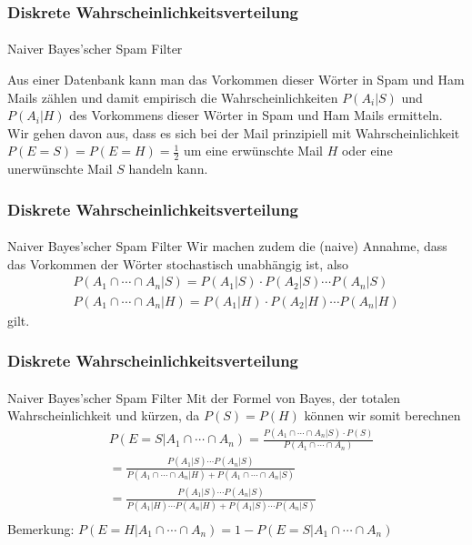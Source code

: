 \documentclass{beamer}
\begin{document}
\begin{frame}
    \frametitle{Diskrete Wahrscheinlichkeitsverteilung}
\framesubtitle{}

\begin{block}{Naiver Bayes'scher Spam Filter}

Aus einer Datenbank kann man das Vorkommen dieser Wörter in Spam und Ham Mails zählen und damit empirisch die Wahrscheinlichkeiten $P(A_i | S)$ und $P(A_i | H) $ des Vorkommens dieser Wörter in Spam und Ham Mails ermitteln.  Wir gehen davon aus, dass es sich bei der Mail  prinzipiell mit  Wahrscheinlichkeit $P(E= S) = P(E= H)= \frac{1}{2}$  um eine erwünschte  Mail $H$ oder eine unerwünschte Mail $S$  handeln kann. 
\end{block}

 \end{frame}



\begin{frame}
    \frametitle{Diskrete Wahrscheinlichkeitsverteilung}
\framesubtitle{}

\begin{block}{Naiver Bayes'scher Spam Filter}
 Wir machen zudem die (naive) Annahme, dass das Vorkommen der Wörter  stochastisch unabhängig ist, also 
\begin{align*}
P(A_1 \cap \cdots \cap A_n | S) = P(A_1 | S) \cdot P(A_2 | S) \cdots P(A_n | S) \\
P(A_1 \cap \cdots \cap A_n | H) = P(A_1 | H) \cdot P(A_2 | H) \cdots P(A_n | H)
\end{align*}
gilt.
\end{block}

 \end{frame}


\begin{frame}
    \frametitle{Diskrete Wahrscheinlichkeitsverteilung}
\framesubtitle{}

\begin{block}{Naiver Bayes'scher Spam Filter}
Mit der Formel von Bayes, der totalen Wahrscheinlichkeit  und kürzen, da $P(S) = P(H)$ können wir somit berechnen
\begin{align*}
& P(E=S |  A_1 \cap \cdots \cap A_n) = \frac{P(A_1 \cap \cdots \cap A_n | S) \cdot P(S)}{P(A_1 \cap \cdots \cap A_n)} \\
&=  \frac{P(A_1 | S) \cdots P(A_n | S) }{P(A_1 \cap \cdots \cap A_n | H) + P(A_1 \cap \cdots \cap A_n | S)} \\
&=  \frac{P(A_1 | S) \cdots P(A_n | S) }{P(A_1 | H) \cdots P(A_n | H)  + P(A_1 | S) \cdots P(A_n | S) } \\
\end{align*}
Bemerkung: $P(E=H |  A_1 \cap \cdots \cap A_n) = 1- P(E=S |  A_1 \cap \cdots \cap A_n) $
\end{block}



 \end{frame}
\end{document}
